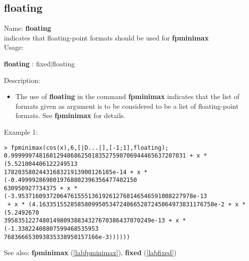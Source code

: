 \subsection{floating}
\label{labfloating}
\noindent Name: \textbf{floating}\\
indicates that floating-point formats should be used for \textbf{fpminimax}\\
\noindent Usage: 
\begin{center}
\textbf{floating} : \textsf{fixed$|$floating}\\
\end{center}
\noindent Description: \begin{itemize}

\item The use of \textbf{floating} in the command \textbf{fpminimax} indicates that the list of
   formats given as argument is to be considered to be a list of floating-point
   formats.
   See \textbf{fpminimax} for details.
\end{itemize}
\noindent Example 1: 
\begin{center}\begin{minipage}{15cm}\begin{Verbatim}[frame=single]
> fpminimax(cos(x),6,[|D...|],[-1;1],floating);
0.99999974816012948686250183527590706944465637207031 + x * (5.521004406122249513
1782035802443168321913900126185e-14 + x * (-0.4999928698019768802396356477402150
630950927734375 + x * (-3.95371609372064761555136192612768146546591008227978e-13
 + x * (4.16335155285858099505347240665287245064973831176758e-2 + x * (5.2492670
395835122748014980938834327670386437070249e-13 + x * (-1.33822408807599468535953
768366653093835338950157166e-3))))))
\end{Verbatim}
\end{minipage}\end{center}
See also: \textbf{fpminimax} (\ref{labfpminimax}), \textbf{fixed} (\ref{labfixed})
